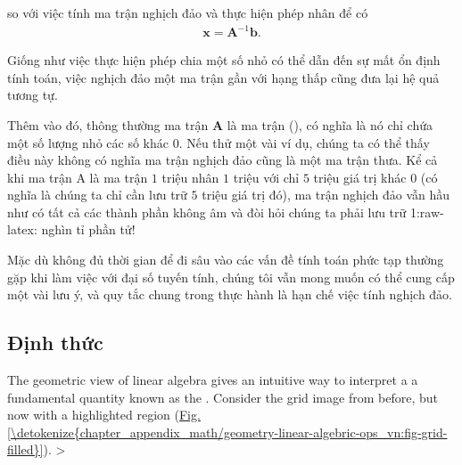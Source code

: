 \documentclass[letterpaper,11pt,english]{sphinxmanual}
\begin{document}
so với việc tính ma trận nghịch đảo và thực hiện phép nhân để có
\begin{equation}\label{equation:chapter_appendix_math/geometry-linear-algebric-ops_vn:chapter_appendix_math/geometry-linear-algebric-ops_vn:23}
\begin{split}\mathbf{x} = \mathbf{A}^{-1}\mathbf{b}.\end{split}
\end{equation}


Giống như việc thực hiện phép chia một số nhỏ có thể dẫn đến sự mất ổn
định tính toán, việc nghịch đảo một ma trận gần với hạng thấp cũng đưa
lại hệ quả tương tự.



Thêm vào đó, thông thường ma trận \(\mathbf{A}\) là ma trận 
(), có nghĩa là nó chỉ chứa một số lượng nhỏ các số khác 0. Nếu
thử một vài ví dụ, chúng ta có thể thấy điều này không có nghĩa ma trận
nghịch đảo cũng là một ma trận thưa. Kể cả khi ma trận A là ma trận
\(1\) triệu nhân \(1\) triệu với chỉ \(5\) triệu giá trị
khác 0 (có nghĩa là chúng ta chỉ cần lưu trữ \(5\) triệu giá trị
đó), ma trận nghịch đảo vẫn hầu như có tất cả các thành phần không âm và
đòi hỏi chúng ta phải lưu trữ 1:raw-latex: nghìn tỉ phần tử!



Mặc dù không đủ thời gian để đi sâu vào các vấn đề tính toán phức tạp
thường gặp khi làm việc với đại số tuyến tính, chúng tôi vẫn mong muốn
có thể cung cấp một vài lưu ý, và quy tắc chung trong thực hành là hạn
chế việc tính nghịch đảo.








\subsection{Định thức}
\label{\detokenize{chapter_appendix_math/geometry-linear-algebric-ops_vn:dinh-thuc}}
The geometric view of linear algebra gives an intuitive way to interpret
a a fundamental quantity known as the . Consider the grid
image from before, but now with a highlighted region
(\hyperref[\detokenize{chapter_appendix_math/geometry-linear-algebric-ops_vn:fig-grid-filled}]{Fig.\@ \ref{\detokenize{chapter_appendix_math/geometry-linear-algebric-ops_vn:fig-grid-filled}}}). \textendash{}\textgreater{}
\end{document}
